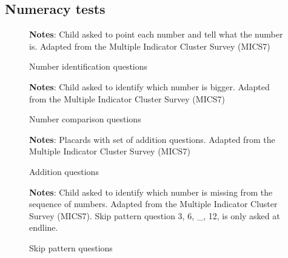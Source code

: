 \documentclass[hidelinks,12pt]{article}
\begin{document}
\subsection{Numeracy tests}\label{appendix:numeracy_tests} %

\begin{figure}[H]
\centering
\caption{Number identification questions}\label{fig:num_identification}
\footnotesize{\justify\textbf{Notes}: Child asked to point each number and tell what the number is. Adapted from the Multiple Indicator Cluster Survey (MICS7)}
\end{figure}

\begin{figure}[H]
\centering
\caption{Number comparison questions}\label{fig:num_bigger}
\footnotesize{\justify\textbf{Notes}: Child asked to identify which number is bigger. Adapted from the Multiple Indicator Cluster Survey (MICS7)}
\end{figure}

\begin{figure}[H]
\centering
\caption{Addition questions}\label{fig:num_addition}
\footnotesize{\justify\textbf{Notes}: Placards with set of addition questions. Adapted from the Multiple Indicator Cluster Survey (MICS7)}
\end{figure}

\begin{figure}[H]
\centering
\caption{Skip pattern questions}\label{fig:num_skip}
\footnotesize{\justify\textbf{Notes}: Child asked to identify which number is missing from the sequence of numbers. Adapted from the Multiple Indicator Cluster Survey (MICS7). Skip pattern question 3, 6, \_, 12, is only asked at endline.}
\end{figure}
\end{document}
